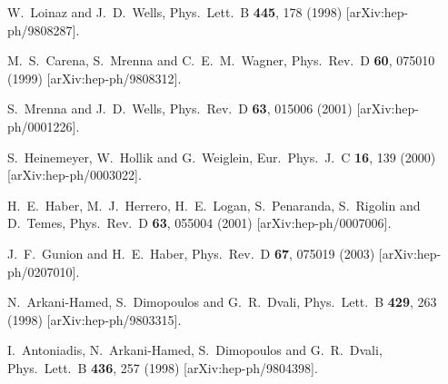 \documentclass[12pt]{article}
\begin{document}
\begin{thebibliography}{9}
  W.~Loinaz and J.~D.~Wells,
  Phys.\ Lett.\  B {\bf 445}, 178 (1998)
  [arXiv:hep-ph/9808287].
  
  M.~S.~Carena, S.~Mrenna and C.~E.~M.~Wagner,
  Phys.\ Rev.\  D {\bf 60}, 075010 (1999)
  [arXiv:hep-ph/9808312].
  
  S.~Mrenna and J.~D.~Wells,
  Phys.\ Rev.\  D {\bf 63}, 015006 (2001)
  [arXiv:hep-ph/0001226].
  
  S.~Heinemeyer, W.~Hollik and G.~Weiglein,
  Eur.\ Phys.\ J.\  C {\bf 16}, 139 (2000)
  [arXiv:hep-ph/0003022].
  
  H.~E.~Haber, M.~J.~Herrero, H.~E.~Logan, S.~Penaranda, S.~Rigolin and D.~Temes,
  Phys.\ Rev.\  D {\bf 63}, 055004 (2001)
  [arXiv:hep-ph/0007006].
  
  J.~F.~Gunion and H.~E.~Haber,
  Phys.\ Rev.\  D {\bf 67}, 075019 (2003)
  [arXiv:hep-ph/0207010].
  


  N.~Arkani-Hamed, S.~Dimopoulos and G.~R.~Dvali,
  Phys.\ Lett.\  B {\bf 429}, 263 (1998)
  [arXiv:hep-ph/9803315].

  I.~Antoniadis, N.~Arkani-Hamed, S.~Dimopoulos and G.~R.~Dvali,
  Phys.\ Lett.\  B {\bf 436}, 257 (1998)
  [arXiv:hep-ph/9804398].


\end{thebibliography}
\end{document}
